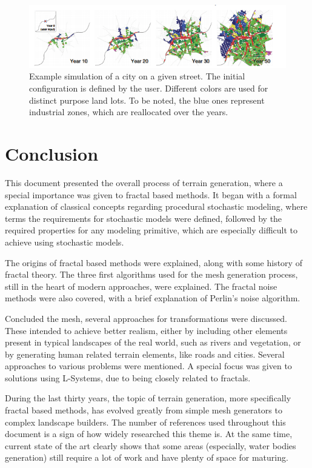 \documentclass{acmtog}
\begin{document}
\begin{figure}[!htp]
	\begin{center}
		\includegraphics[width=\columnwidth]{images/citytime.png}
	\end{center}
	\caption{Example simulation of a city on a given street. The initial configuration is defined by the user. Different colors are used for distinct purpose land lots. To be noted, the blue ones represent industrial zones, which are reallocated over the years.}
\end{figure}

\section{Conclusion}
This document presented the overall process of terrain generation, where a special importance was given to fractal based methods. It began with a formal explanation of classical concepts regarding procedural stochastic modeling, where terms the requirements for stochastic models were defined, followed by the required properties for any modeling primitive, which are especially difficult to achieve using stochastic models.

The origins of fractal based methods were explained, along with some history of fractal theory. The three first algorithms used for the mesh generation process, still in the heart of modern approaches, were explained. The fractal noise methods were also covered, with a brief explanation of Perlin's noise algorithm.

Concluded the mesh, several approaches for transformations were discussed. These intended to achieve better realism, either by including other elements present in typical landscapes of the real world, such as rivers and vegetation, or by generating human related terrain elements, like roads and cities. Several approaches to various problems were mentioned. A special focus was given to solutions using L-Systems, due to being closely related to fractals.

During the last thirty years, the topic of terrain generation, more specifically fractal based methods, has evolved greatly from simple mesh generators to complex landscape builders. The number of references used throughout this document is a sign of how widely researched this theme is. At the same time, current state of the art clearly shows that some areas (especially, water bodies generation) still require a lot of work and have plenty of space for maturing.
\end{document}

